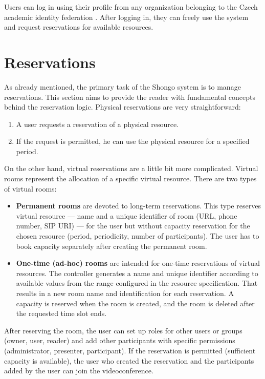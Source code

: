 Users can log in using their profile from any organization belonging to the Czech academic identity federation .
After logging in, they can freely use the system and request reservations for available resources.

\section{Reservations}
As already mentioned, the primary task of the Shongo system is to manage reservations. This section aims to provide the reader with fundamental concepts behind the reservation logic.
Physical reservations are very straightforward:
\begin{enumerate}
    \item A user requests a reservation of a physical resource.
    \item If the request is permitted, he can use the physical resource for a specified period.
\end{enumerate}
On the other hand, virtual reservations are a little bit more complicated. Virtual rooms represent the allocation of a specific virtual resource. There are two types of virtual rooms:
\begin{itemize}
    \item \textbf{Permanent rooms} are devoted to long-term reservations. This type reserves virtual resource — name and a unique identifier of room (URL, phone number, SIP URI) — for the user but without capacity reservation for the chosen resource (period, periodicity, number of participants). The user has to book capacity separately after creating the permanent room.
    \item \textbf{One-time (ad-hoc) rooms} are intended for one-time reservations of virtual resources. The controller generates a name and unique identifier according to available values from the range configured in the resource specification. That results in a new room name and identification for each reservation. A capacity is reserved when the room is created, and the room is deleted after the requested time slot ends.
\end{itemize}
After reserving the room, the user can set up roles for other users or groups (owner, user, reader) and add other participants with specific permissions (administrator, presenter, participant).
If the reservation is permitted (sufficient capacity is available), the user who created the reservation and the participants added by the user can join the videoconference.


